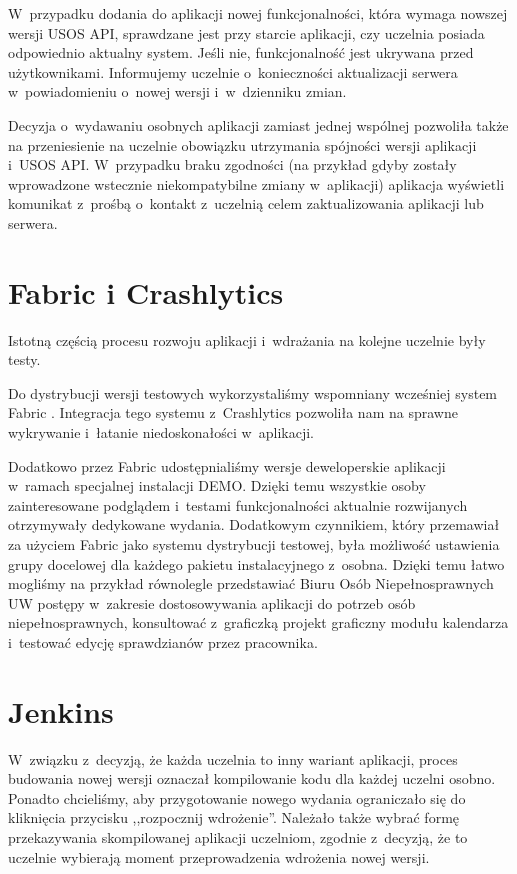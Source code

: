 \documentclass{pracamgr}
\begin{document}
W~przypadku dodania do aplikacji nowej funkcjonalności, która wymaga nowszej wersji USOS API, sprawdzane jest przy starcie
aplikacji, czy uczelnia posiada odpowiednio aktualny system. Jeśli nie, funkcjonalność jest ukrywana przed użytkownikami.
Informujemy uczelnie o~konieczności aktualizacji serwera w~powiadomieniu o~nowej wersji i~w~dzienniku zmian.

Decyzja o~wydawaniu osobnych aplikacji zamiast jednej wspólnej pozwoliła także na przeniesienie na uczelnie obowiązku
utrzymania spójności wersji aplikacji i~USOS API. W~przypadku braku zgodności (na przykład gdyby zostały wprowadzone
wstecznie niekompatybilne zmiany w~aplikacji) aplikacja wyświetli komunikat z~prośbą o~kontakt z~uczelnią celem zaktualizowania
aplikacji lub serwera.

\section{Fabric i Crashlytics}

Istotną częścią procesu rozwoju aplikacji i~wdrażania na kolejne uczelnie były testy.

Do dystrybucji wersji testowych wykorzystaliśmy wspomniany wcześniej system Fabric \cite{fabric}. 
Integracja tego systemu z~Crashlytics pozwoliła nam na sprawne wykrywanie i~łatanie niedoskonałości w~aplikacji.

Dodatkowo przez Fabric udostępnialiśmy wersje deweloperskie aplikacji w~ramach specjalnej instalacji DEMO. Dzięki temu
wszystkie osoby zainteresowane podglądem i~testami funkcjonalności aktualnie rozwijanych otrzymywały dedykowane wydania.
Dodatkowym czynnikiem, który przemawiał za użyciem Fabric jako systemu dystrybucji testowej, była możliwość ustawienia grupy
docelowej dla każdego pakietu instalacyjnego z~osobna. Dzięki temu łatwo mogliśmy na przykład równolegle przedstawiać
Biuru Osób Niepełnosprawnych UW postępy w~zakresie dostosowywania aplikacji do potrzeb osób niepełnosprawnych, konsultować
z~graficzką projekt graficzny modułu kalendarza i~testować edycję sprawdzianów przez pracownika.

\section{Jenkins}

W~związku z~decyzją, że każda uczelnia to inny wariant aplikacji, proces budowania nowej wersji oznaczał kompilowanie
kodu dla każdej uczelni osobno. Ponadto chcieliśmy, aby przygotowanie nowego wydania ograniczało się do kliknięcia przycisku
,,rozpocznij wdrożenie''. Należało także wybrać formę przekazywania skompilowanej aplikacji uczelniom, zgodnie
z~decyzją, że to uczelnie wybierają moment przeprowadzenia wdrożenia nowej wersji.
\end{document}
